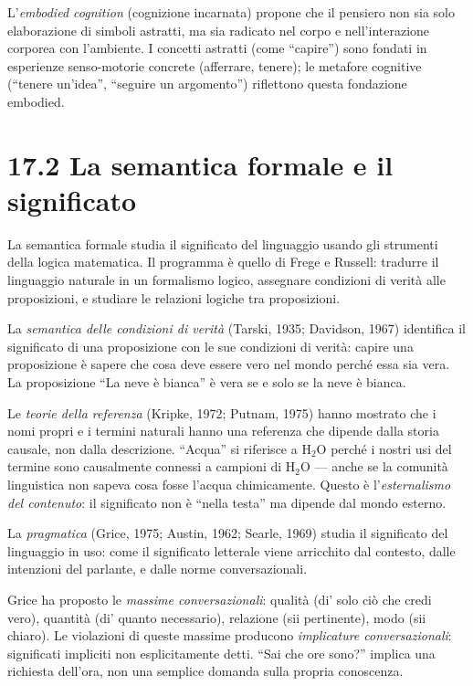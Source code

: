 \documentclass[11.5pt,a4paper,openany]{book}
\theoremstyle{remark}
\begin{document}
L'\textit{embodied cognition} (cognizione incarnata) propone che il pensiero non sia solo elaborazione di simboli astratti, ma sia radicato nel corpo e nell'interazione corporea con l'ambiente. I concetti astratti (come ``capire'') sono fondati in esperienze senso-motorie concrete (afferrare, tenere); le metafore cognitive (``tenere un'idea'', ``seguire un argomento'') riflettono questa fondazione embodied.

\section{17.2 La semantica formale e il significato}

La semantica formale studia il significato del linguaggio usando gli strumenti della logica matematica. Il programma è quello di Frege e Russell: tradurre il linguaggio naturale in un formalismo logico, assegnare condizioni di verità alle proposizioni, e studiare le relazioni logiche tra proposizioni.

La \textit{semantica delle condizioni di verità} (Tarski, 1935; Davidson, 1967) identifica il significato di una proposizione con le sue condizioni di verità: capire una proposizione è sapere che cosa deve essere vero nel mondo perché essa sia vera. La proposizione ``La neve è bianca'' è vera se e solo se la neve è bianca.

Le \textit{teorie della referenza} (Kripke, 1972; Putnam, 1975) hanno mostrato che i nomi propri e i termini naturali hanno una referenza che dipende dalla storia causale, non dalla descrizione. ``Acqua'' si riferisce a H$_2$O perché i nostri usi del termine sono causalmente connessi a campioni di H$_2$O --- anche se la comunità linguistica non sapeva cosa fosse l'acqua chimicamente. Questo è l'\textit{esternalismo del contenuto}: il significato non è ``nella testa'' ma dipende dal mondo esterno.

La \textit{pragmatica} (Grice, 1975; Austin, 1962; Searle, 1969) studia il significato del linguaggio in uso: come il significato letterale viene arricchito dal contesto, dalle intenzioni del parlante, e dalle norme conversazionali.

Grice ha proposto le \textit{massime conversazionali}: qualità (di' solo ciò che credi vero), quantità (di' quanto necessario), relazione (sii pertinente), modo (sii chiaro). Le violazioni di queste massime producono \textit{implicature conversazionali}: significati impliciti non esplicitamente detti. ``Sai che ore sono?'' implica una richiesta dell'ora, non una semplice domanda sulla propria conoscenza.
\end{document}
